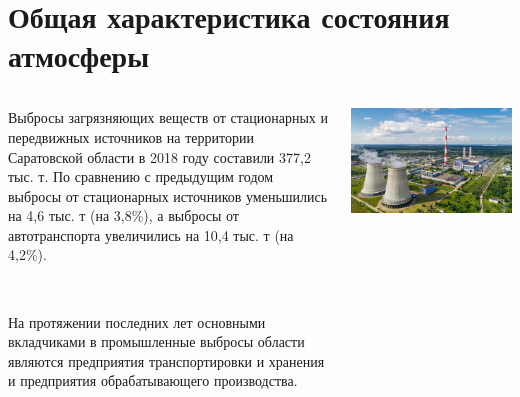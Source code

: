 \section{Общая характеристика состояния атмосферы}
\begin{frame}{\insertsectionhead}
    \begin{columns}
        \begin{column}{.55\linewidth}
        \footnotesize
        Выбросы загрязняющих веществ от стационарных и 
        передвижных источников на территории Саратовской области в 2018 году составили 377,2 тыс. т.
        По сравнению с предыдущим годом выбросы от стационарных источников уменьшились на 4,6 тыс. т (на 3,8\%), а 
        выбросы от автотранспорта увеличились на 10,4 тыс. т (на 4,2\%).
        
        ~ %

        На протяжении последних лет основными вкладчиками в промышленные выбросы области являются предприятия транспортировки и хранения и предприятия обрабатывающего производства. 
        \end{column}

        \begin{column}{.42\linewidth}
            \includegraphics[width=1.1\textwidth]{assets/tes.jpg}
        \end{column}
    \end{columns}
\end{frame}

